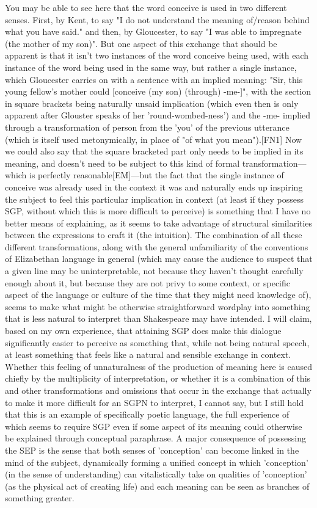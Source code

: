 \documentclass[]{article}
\begin{document}
You may be able to see here that the word conceive is used in two different senses. First, by Kent, to say "I do not understand the meaning of/reason behind what you have said." and then, by Gloucester, to say "I was able to impregnate (the mother of my son)". But one aspect of this exchange that should be apparent is that it isn't two instances of the word conceive being used, with each instance of the word being used in the same way, but rather a single instance, which Gloucester carries on with a sentence with an implied meaning: "Sir, this young fellow's mother could [conceive (my son) (through) -me-]", with the section in square brackets being naturally unsaid implication (which even then is only apparent after Glouster speaks of her 'round-wombed-ness') and the -me- implied through a transformation of person from the 'you' of the previous utterance (which is itself used metonymically, in place of "of what you mean").[FN1] Now we could also say that the square bracketed part only needs to be implied in its meaning, and doesn't need to be subject to this kind of formal transformation—which is perfectly reasonable[EM]—but the fact that the single instance of conceive was already used in the context it was and naturally ends up inspiring the subject to feel this particular implication in context (at least if they possess SGP, without which this is more difficult to perceive) is something that I have no better means of explaining, as it seems to take advantage of structural similarities between the expressions to craft it (the intuition). The combination of all these different transformations, along with the general unfamiliarity of the conventions of Elizabethan language in general (which may cause the audience to suspect that a given line may be uninterpretable, not because they haven't thought carefully enough about it, but because they are not privy to some context, or specific aspect of the language or culture of the time that they might need knowledge of), seems to make what might be otherwise straightforward wordplay into something that is less natural to interpret than Shakespeare may have intended. I will claim, based on my own experience, that attaining SGP does make this dialogue significantly easier to perceive as something that, while not being natural speech, at least something that feels like a natural and sensible exchange in context. Whether this feeling of unnaturalness of the production of meaning here is caused chiefly by the multiplicity of interpretation, or whether it is a combination of this and other transformations and omissions that occur in the exchange that actually to make it more difficult for an SGPN to interpret, I cannot say, but I still hold that this is an example of specifically poetic language, the full experience of which seems to require SGP even if some aspect of its meaning could otherwise be explained through conceptual paraphrase. A major consequence of possessing the SEP is the sense that both senses of 'conception' can become linked in the mind of the subject, dynamically forming a unified concept in which 'conception' (in the sense of understanding) can vitalistically take on qualities of 'conception' (as the physical act of creating life) and each meaning can be seen as branches of something greater.
\end{document}
